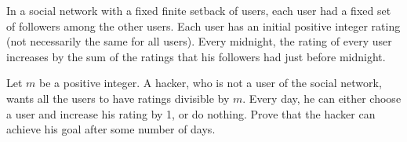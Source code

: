 In a social network with a fixed finite setback of users, each user had a fixed set of followers among the other users. Each user has an initial positive integer rating (not necessarily the same for all users). Every midnight, the rating of every user increases by the sum of the ratings that his followers had just before midnight.

Let $m$ be a positive integer. A hacker, who is not a user of the social network, wants all the users to have ratings divisible by $m$. Every day, he can either choose a user and increase his rating by 1, or do nothing. Prove that the hacker can achieve his goal after some number of days.